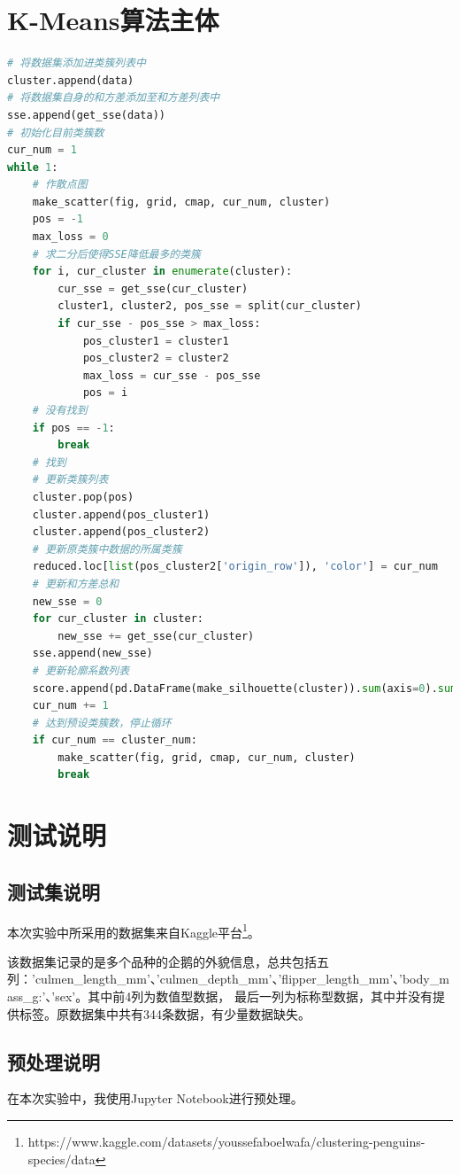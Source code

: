 \documentclass[a4paper,11pt]{article}%
\theoremstyle{remark}
\theoremstyle{remark}
\theoremstyle{definition}
\theoremstyle{definition}
\theoremstyle{definition}
\begin{document}
\section{K-Means算法主体}
\begin{lstlisting}[language={Python},keywordstyle=\color{blue!70},commentstyle=\color{red!50!green!50!blue!50},frame=shadowbox,
    rulesepcolor=\color{red!20!green!20!blue!20}]
# 将数据集添加进类簇列表中
cluster.append(data)
# 将数据集自身的和方差添加至和方差列表中
sse.append(get_sse(data))
# 初始化目前类簇数
cur_num = 1
while 1:
    # 作散点图
    make_scatter(fig, grid, cmap, cur_num, cluster)
    pos = -1
    max_loss = 0
    # 求二分后使得SSE降低最多的类簇
    for i, cur_cluster in enumerate(cluster):
        cur_sse = get_sse(cur_cluster)
        cluster1, cluster2, pos_sse = split(cur_cluster)
        if cur_sse - pos_sse > max_loss:
            pos_cluster1 = cluster1
            pos_cluster2 = cluster2
            max_loss = cur_sse - pos_sse
            pos = i
    # 没有找到
    if pos == -1:
        break
    # 找到
    # 更新类簇列表
    cluster.pop(pos)
    cluster.append(pos_cluster1)
    cluster.append(pos_cluster2)
    # 更新原类簇中数据的所属类簇
    reduced.loc[list(pos_cluster2['origin_row']), 'color'] = cur_num
    # 更新和方差总和
    new_sse = 0
    for cur_cluster in cluster:
        new_sse += get_sse(cur_cluster)
    sse.append(new_sse)
    # 更新轮廓系数列表
    score.append(pd.DataFrame(make_silhouette(cluster)).sum(axis=0).sum(axis=0) / reduced.shape[0])
    cur_num += 1
    # 达到预设类簇数，停止循环
    if cur_num == cluster_num:
        make_scatter(fig, grid, cmap, cur_num, cluster)
        break
\end{lstlisting}
\section{测试说明}
\subsection{测试集说明}
本次实验中所采用的数据集来自Kaggle平台\footnote{https://www.kaggle.com/datasets/youssefaboelwafa/clustering-penguins-species/data}。

该数据集记录的是多个品种的企鹅的外貌信息，总共包括五列：'culmen\_length\_mm'、'culmen\_depth\_mm'、'flipper\_length\_mm'、'body\_mass\_g:'、'sex'。其中前4列为数值型数据，
最后一列为标称型数据，其中并没有提供标签。原数据集中共有344条数据，有少量数据缺失。
\subsection{预处理说明}
在本次实验中，我使用Jupyter Notebook进行预处理。
\end{document}

